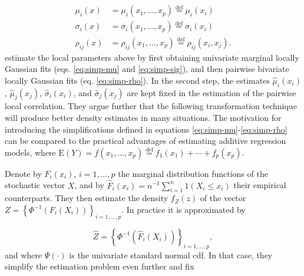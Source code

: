 \begin{align}
\mu_i\left(x\right) &= \mu_i\left(x_1, \ldots, x_p\right) \stackrel{\textrm{def}}{=} \mu_i\left(x_i\right) \label{eq:simp-mu}\\
\sigma_i\left(x\right) &= \sigma_i\left(x_1, \ldots, x_p\right)  \stackrel{\textrm{def}}{=} \sigma_i\left(x_i\right) \label{eq:simp-sig} \\
\rho_{ij}\left(x\right) &= \rho_{ij}\left(x_1, \ldots, x_p\right) \stackrel{\textrm{def}}{=} \rho_{ij}\left(x_i, x_j\right). \label{eq:simp-rho}
\end{align}
\citet{otne:tjos:2017} estimate the local parameters above by first obtaining univariate marginal locally Gaussian fits (eqs. \ref{eq:simp-mu} and \ref{eq:simp-sig}), and then pairwise bivariate locally Gaussian fits (eq. \ref{eq:simp-rho}). In the second step, the estimates $\widehat\mu_i\left(x_i\right)$, $\widehat\mu_j\left(x_j\right)$, $\widehat\sigma_i\left(x_i\right)$, and $\widehat\sigma_j\left(x_j\right)$ are kept fixed in the estimation of the pairwise local correlation. They argue further that the following transformation technique will produce better density estimates in many situations. The motivation for introducing the simplifications defined in equations \ref{eq:simp-mu}-\ref{eq:simp-rho} can be compared to the practical advantages of estimating additive regression models, where $\textrm{E}\left(Y\right) = f\left(x_1, \ldots, x_p\right) \stackrel{\textrm{def}}{=} f_1\left(x_1\right) + \cdots + f_p\left(x_p\right)$.

Denote by $F_i\left(x_i\right)$, $i = 1,\ldots, p$ the marginal distribution functions of the stochastic vector $X$, and by $\widehat F_i\left(x_i\right) = n^{-1}\sum_{i=1}^n 1\left(X_i \leq x_i\right)$ their empirical counterparts. They then estimate the density $f_Z\left(z\right)$ of the vector $Z = \left\{\Phi^{-1}\left(F_i\left(X_i\right)\right)\right\}_{i=1,\ldots,p}$. In practice it is approximated by 

\begin{equation}
\widehat Z = \left\{\Phi^{-1}\left(\widehat F_i\left(X_i\right)\right)\right\}_{i=1,\ldots,p}, 
\label{eq:trans}
\end{equation}
and where $\Psi\left(\cdot\right)$ is the univariate standard normal cdf. In that case, they simplify the estimation problem even further and fix

